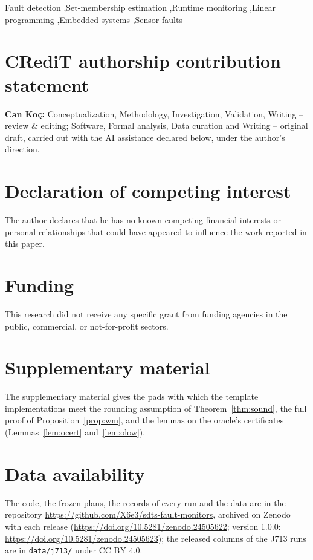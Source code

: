 \documentclass[a4paper,fleqn]{cas-dc}
\begin{document}
\begin{keywords}
Fault detection \sep Set-membership estimation \sep Runtime monitoring \sep Linear programming \sep Embedded systems
\sep Sensor faults
\end{keywords}

\maketitle



\section*{CRediT authorship contribution statement}
\textbf{Can Ko\c{c}:} Conceptualization, Methodology, Investigation, Validation, Writing -- review \& editing;
Software, Formal analysis, Data curation and Writing -- original draft, carried out with the AI assistance
declared below, under the author's direction.

\section*{Declaration of competing interest}
The author declares that he has no known competing financial interests or personal relationships that could have
appeared to influence the work reported in this paper.

\section*{Funding}
This research did not receive any specific grant from funding agencies in the public, commercial, or not-for-profit
sectors.

\section*{Supplementary material}
The supplementary material gives the pads with which the template implementations meet the rounding assumption of
Theorem~\ref{thm:sound}, the full proof of
Proposition~\ref{prop:wm}, and the lemmas on the oracle's certificates (Lemmas~\ref{lem:ocert} and~\ref{lem:olow}).

\section*{Data availability}
The code, the frozen plans, the records of every run and the data are in the repository
\url{https://github.com/X6e3/sdts-fault-monitors}, archived on Zenodo with each release
(\url{https://doi.org/10.5281/zenodo.24505622}; version 1.0.0: \url{https://doi.org/10.5281/zenodo.24505623}); the
released columns of the J713 runs are in \texttt{data/j713/} under CC BY 4.0.
\end{document}
